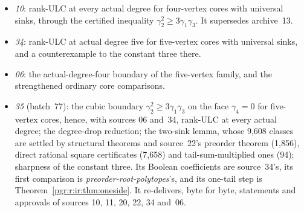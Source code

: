 \documentclass[11pt]{article}
\numberwithin{equation}{section}
\theoremstyle{definition}\newtheorem{definition}[theorem]{Definition}\newtheorem{remark}[theorem]{Remark}
\newcommand{\prp}{\emph{preorder-root-polytopes}}
\begin{document}
\begin{itemize}[leftmargin=*]
  size with universal sinks.
\item \emph{10}: rank-ULC at every actual degree for four-vertex cores with
  universal sinks, through the certified inequality
  $\gamma_2^2\ge3\gamma_1\gamma_3$. It supersedes archive~13.
\item \emph{34}: rank-ULC at actual degree five for five-vertex cores with
  universal sinks, and a counterexample to the constant three there.
\item \emph{06}: the actual-degree-four boundary of the five-vertex family,
  and the strengthened ordinary core comparisons.
\item \emph{35} (batch~77): the cubic boundary
  $\gamma_2^2\ge3\gamma_1\gamma_3$ on the face $\gamma_4=0$ for
  five-vertex cores, hence, with sources 06 and~34, rank-ULC at every
  actual degree; the degree-drop reduction; the two-sink lemma, whose
  9,608 classes are settled by structural theorems and source~22's
  preorder theorem (1,856), direct rational square certificates (7,658) and
  tail-sum-multiplied ones (94); sharpness of the constant three. Its
  Boolean coefficients are source~34's, its first comparison is \prp's,
  and its one-tail step is Theorem~\ref{pgr:r:ir:thm:oneside}. It
  re-delivers, byte for byte, statements and approvals of sources 10, 11,
  20, 22, 34 and~06.
\end{itemize}
\end{document}
